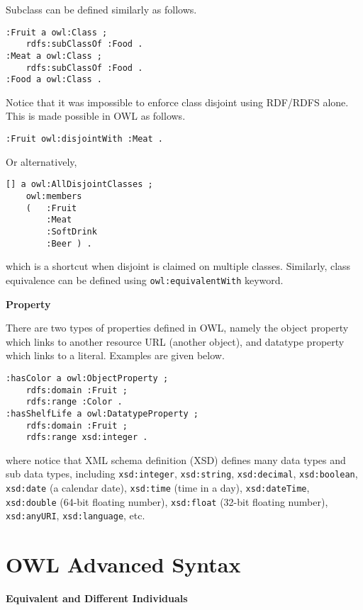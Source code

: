 Subclass can be defined similarly as follows.
\begin{lstlisting}
:Fruit a owl:Class ;
	rdfs:subClassOf :Food .
:Meat a owl:Class ;
	rdfs:subClassOf :Food .
:Food a owl:Class .
\end{lstlisting}

Notice that it was impossible to enforce class disjoint using RDF/RDFS alone. This is made possible in OWL as follows.
\begin{lstlisting}
:Fruit owl:disjointWith :Meat .
\end{lstlisting}
Or alternatively,
\begin{lstlisting}
[] a owl:AllDisjointClasses ;
	owl:members
	(	:Fruit
		:Meat
		:SoftDrink
		:Beer ) .
\end{lstlisting}
which is a shortcut when disjoint is claimed on multiple classes. Similarly, class equivalence can be defined using \verb|owl:equivalentWith| keyword.

\vspace{0.1in}
\noindent \textbf{Property}
\vspace{0.1in}

There are two types of properties defined in OWL, namely the object property which links to another resource URL (another object), and datatype property which links to a literal. Examples are given below.
\begin{lstlisting}
:hasColor a owl:ObjectProperty ;
	rdfs:domain :Fruit ;
	rdfs:range :Color .
:hasShelfLife a owl:DatatypeProperty ;
	rdfs:domain :Fruit ;
	rdfs:range xsd:integer .
\end{lstlisting}
where notice that XML schema definition (XSD) defines many data types and sub data types, including \verb|xsd:integer|, \verb|xsd:string|, \verb|xsd:decimal|, \verb|xsd:boolean|, \verb|xsd:date| (a calendar date), \verb|xsd:time| (time in a day), \verb|xsd:dateTime|, \verb|xsd:double| (64-bit floating number), \verb|xsd:float| (32-bit floating number), \verb|xsd:anyURI|, \verb|xsd:language|, etc.

\section{OWL Advanced Syntax}

\vspace{0.1in}
\noindent \textbf{Equivalent and Different Individuals}
\vspace{0.1in}

